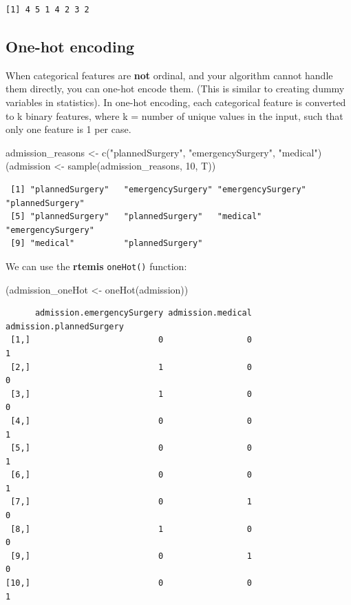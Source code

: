 \documentclass[
]{book}
\newenvironment{Shaded}{\begin{snugshade}}{\end{snugshade}}
\newcommand{\DecValTok}[1]{\textcolor[rgb]{0.00,0.00,0.81}{#1}}
\newcommand{\FunctionTok}[1]{\textcolor[rgb]{0.00,0.00,0.00}{#1}}
\newcommand{\NormalTok}[1]{#1}
\newcommand{\OtherTok}[1]{\textcolor[rgb]{0.56,0.35,0.01}{#1}}
\newcommand{\StringTok}[1]{\textcolor[rgb]{0.31,0.60,0.02}{#1}}
\begin{document}
\begin{verbatim}
[1] 4 5 1 4 2 3 2
\end{verbatim}

\hypertarget{one-hot-encoding}{%
\subsection{One-hot encoding}\label{one-hot-encoding}}

When categorical features are \textbf{not} ordinal, and your algorithm cannot handle them directly, you can one-hot encode them. (This is similar to creating dummy variables in statistics). In one-hot encoding, each categorical feature is converted to k binary features, where k = number of unique values in the input, such that only one feature is 1 per case.

\begin{Shaded}
\begin{Highlighting}[]
\NormalTok{admission\_reasons }\OtherTok{\textless{}{-}} \FunctionTok{c}\NormalTok{(}\StringTok{"plannedSurgery"}\NormalTok{, }\StringTok{"emergencySurgery"}\NormalTok{, }\StringTok{"medical"}\NormalTok{)}
\NormalTok{(admission }\OtherTok{\textless{}{-}} \FunctionTok{sample}\NormalTok{(admission\_reasons, }\DecValTok{10}\NormalTok{, T))}
\end{Highlighting}
\end{Shaded}

\begin{verbatim}
 [1] "plannedSurgery"   "emergencySurgery" "emergencySurgery" "plannedSurgery"  
 [5] "plannedSurgery"   "plannedSurgery"   "medical"          "emergencySurgery"
 [9] "medical"          "plannedSurgery"  
\end{verbatim}

We can use the \textbf{rtemis} \texttt{oneHot()} function:

\begin{Shaded}
\begin{Highlighting}[]
\NormalTok{(admission\_oneHot }\OtherTok{\textless{}{-}} \FunctionTok{oneHot}\NormalTok{(admission))}
\end{Highlighting}
\end{Shaded}

\begin{verbatim}
      admission.emergencySurgery admission.medical admission.plannedSurgery
 [1,]                          0                 0                        1
 [2,]                          1                 0                        0
 [3,]                          1                 0                        0
 [4,]                          0                 0                        1
 [5,]                          0                 0                        1
 [6,]                          0                 0                        1
 [7,]                          0                 1                        0
 [8,]                          1                 0                        0
 [9,]                          0                 1                        0
[10,]                          0                 0                        1
\end{verbatim}
\end{document}
